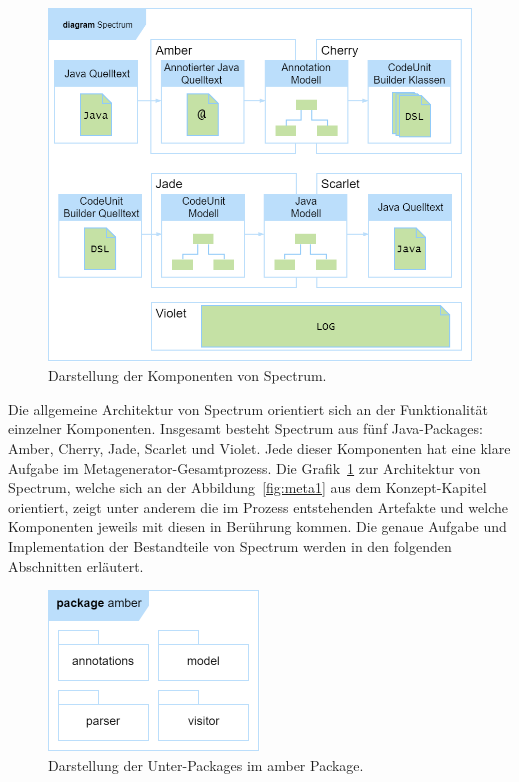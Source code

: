 \documentclass[12pt,oneside,a4paper,parskip]{scrbook}
\begin{document}
\begin{figure}[htbp]
\centering
\includegraphics[width=1.0\textwidth]{bilder/spectrumPackages}
\caption{Darstellung der Komponenten von Spectrum.}
\label{fig:spectrumPackages}
\end{figure}

Die allgemeine Architektur von Spectrum orientiert sich an der Funktionalität einzelner Komponenten. Insgesamt besteht Spectrum aus fünf Java-Packages: Amber, Cherry, Jade, Scarlet und Violet. Jede dieser Komponenten hat eine klare Aufgabe im Metagenerator-Gesamtprozess. Die Grafik~\ref{fig:spectrumPackages} zur Architektur von Spectrum, welche sich an der Abbildung~\ref{fig:meta1} aus dem Konzept-Kapitel orientiert, zeigt unter anderem die im Prozess entstehenden Artefakte und welche Komponenten jeweils mit diesen in Berührung kommen. Die genaue Aufgabe und Implementation der Bestandteile von Spectrum werden in den folgenden Abschnitten erläutert.

\begin{figure}[htbp]
\centering
\includegraphics[width=0.5\textwidth]{bilder/amber}
\caption{Darstellung der Unter-Packages im amber Package.}
\label{fig:amberPackages}
\end{figure}
\end{document}
